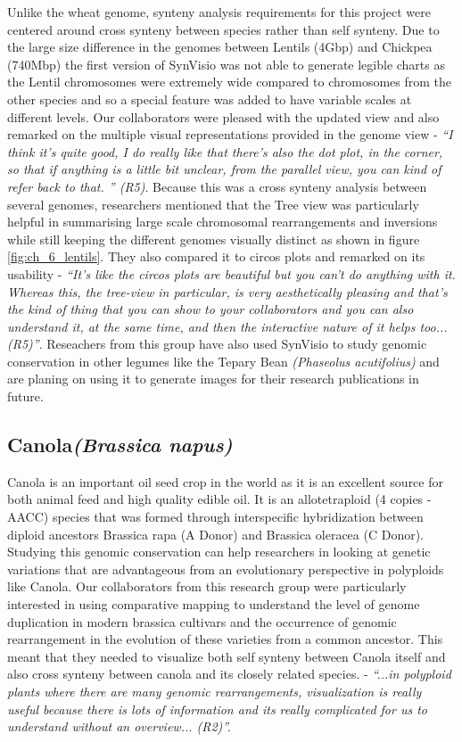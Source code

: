 Unlike the wheat genome, synteny analysis requirements for this project were centered around cross synteny between species rather than self synteny. Due to the large size difference in the genomes between Lentils (4Gbp) and Chickpea (740Mbp) the first version of SynVisio was not able to generate legible charts as the Lentil chromosomes were extremely wide compared to chromosomes from the other species and so a special feature was added to have variable scales at different levels. Our collaborators were pleased with the updated view and also remarked on the multiple visual representations provided in the genome view - \textit{``I think it's quite good, I do really like that there's also the dot plot, in the corner, so that if anything is a little bit unclear, from the parallel view, you can kind of refer back to that.
'' (R5)}. Because this was a cross synteny analysis between several genomes, researchers mentioned that the Tree view was particularly helpful in summarising large scale chromosomal rearrangements and inversions while still keeping the different genomes visually distinct as shown in figure \ref{fig:ch_6_lentils}. They also compared it to circos plots and remarked on its usability - \textit{``It's like the circos plots are beautiful but you can't do anything with it. Whereas this, the tree-view in particular, is very aesthetically pleasing and that's the kind of thing that you can show to your collaborators and you can also understand it, at the same time, and then the interactive nature of it helps too...
(R5)''}. Reseachers from this group have also used SynVisio to study genomic conservation in other legumes like the Tepary Bean \textit{(Phaseolus acutifolius)} and are planing on using it to generate images for their research publications in future.

\subsection{Canola\textit{(Brassica napus)}}
Canola is an important oil seed crop in the world as it is an excellent source for both animal feed and high quality edible oil\cite{shahidi1990canola}. It is an allotetraploid (4 copies - AACC) species that was formed through interspecific hybridization between diploid ancestors Brassica rapa (A Donor) and Brassica oleracea (C Donor)\cite{parkin1995identification}. Studying this genomic conservation can help researchers in looking at genetic variations that are advantageous from an evolutionary perspective in polyploids like Canola. Our collaborators from this research group were particularly interested in using comparative mapping to understand the level of genome duplication in modern brassica cultivars and the occurrence of genomic rearrangement in the evolution of these varieties from a common ancestor. This meant that they needed to visualize both self synteny between Canola itself and also cross synteny between canola and its closely related species. - \textit{``...in polyploid plants where there are many genomic rearrangements, visualization is really useful because there is lots of information and its really complicated for us to understand without an overview... (R2)''.}

